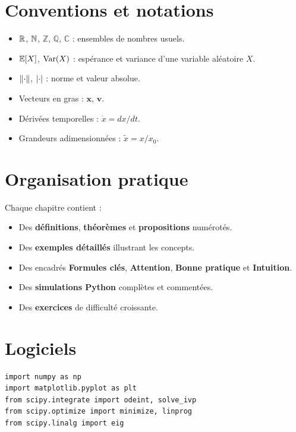 \section*{Conventions et notations}

\begin{itemize}
  \item $\mathbb{R}$, $\mathbb{N}$, $\mathbb{Z}$, $\mathbb{Q}$, $\mathbb{C}$ : ensembles
        de nombres usuels.
  \item $\mathbb{E}[X]$, $\mathrm{Var}(X)$ : esp\'erance et variance d'une variable
        al\'eatoire $X$.
  \item $\left\| \cdot \right\|$, $\left| \cdot \right|$ : norme et valeur absolue.
  \item Vecteurs en gras : $\mathbf{x}$, $\mathbf{v}$.
  \item D\'eriv\'ees temporelles : $\dot{x} = dx/dt$.
  \item Grandeurs adimensionn\'ees : $\tilde{x} = x/x_0$.
\end{itemize}

\section*{Organisation pratique}

Chaque chapitre contient :
\begin{itemize}
  \item Des \textbf{d\'efinitions}, \textbf{th\'eor\`emes} et
        \textbf{propositions} num\'erot\'es.
  \item Des \textbf{exemples d\'etaill\'es} illustrant les concepts.
  \item Des encadr\'es \textbf{Formules cl\'es}, \textbf{Attention},
        \textbf{Bonne pratique} et \textbf{Intuition}.
  \item Des \textbf{simulations Python} compl\`etes et comment\'ees.
  \item Des \textbf{exercices} de difficult\'e croissante.
\end{itemize}

\section*{Logiciels}

\begin{codeblock}[title=\textbf{Biblioth\`eques Python utilis\'ees}]
\begin{verbatim}
import numpy as np
import matplotlib.pyplot as plt
from scipy.integrate import odeint, solve_ivp
from scipy.optimize import minimize, linprog
from scipy.linalg import eig
\end{verbatim}
\end{codeblock}

